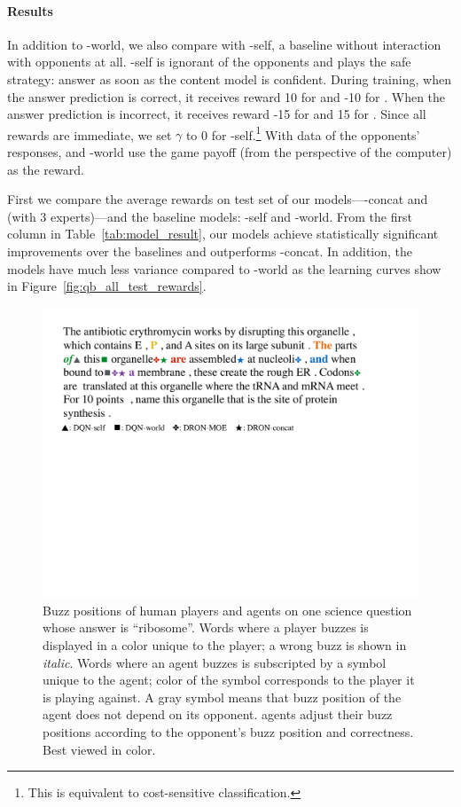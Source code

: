 \paragraph{Results}

In addition to \dqn{}-world, we also compare with \dqn{}-self, a
baseline without interaction with opponents at all. \dqn{}-self is
ignorant of the opponents and plays the safe strategy:
answer as soon as the content model is confident.  During training, when the answer
prediction is correct, it receives reward 10 for  and -10 for
.  When the answer prediction is incorrect, it receives
reward -15 for  and 15 for .  Since all rewards
are immediate, we set $\gamma$ to 0 for \dqn{}-self.\footnote{This is equivalent to cost-sensitive classification.}
With data of the
opponents' responses, \dron{} and \dqn{}-world use the game payoff
(from the perspective of the computer) as the reward.

 

First we compare the average rewards on test set of our models---\dron{}-concat
and \dronmoe{} (with 3 experts)---and the baseline models: \dqn{}-self and
\dqn{}-world.  From the first column in Table~\ref{tab:model_result}, our models
achieve statistically significant improvements over the \dqn{} baselines and
\dronmoe{} outperforms \dron{}-concat.
In addition, the \dron{} models have much less variance compared to \dqn{}-world as the learning curves show in Figure~\ref{fig:qb_all_test_rewards}.


\begin{figure}[t]
\centering
\includegraphics[width=1.0\columnwidth]{2016_icml_opponent/figures/qb_buzz_example}
\caption{Buzz positions of human players and agents on one science question whose answer is ``ribosome''.
Words where a player buzzes is displayed in a color unique to the player;
a wrong buzz is shown in \emph{italic}.
Words where an agent buzzes is subscripted by a symbol unique to the agent;
color of the symbol corresponds to the player it is playing against.
A gray symbol means that buzz position of the agent does not depend on its opponent.
\dron{} agents adjust their buzz positions according to the opponent's buzz position and correctness.
Best viewed in color.}
\label{fig:buzz_example}
\end{figure}

